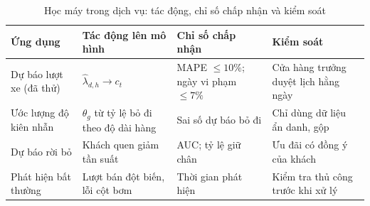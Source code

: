 {\begin{table}[htbp]\centering\small
\caption{Học máy trong dịch vụ: tác động, chỉ số chấp nhận và kiểm soát}\label{r3:ml-uses}
\begin{tabularx}{\linewidth}{@{}p{27mm}Y Y Y@{}}
\toprule
Ứng dụng & Tác động lên mô hình & Chỉ số chấp nhận & Kiểm soát \\
\midrule
Dự báo lượt xe (đã thử) & $\hat\lambda_{d,h}\to c_t$ & MAPE $\le10\%$; ngày vi phạm $\le7\%$ & Cửa hàng trưởng duyệt lịch hằng ngày \\
Ước lượng độ kiên nhẫn & $\theta_g$ từ tỷ lệ bỏ đi theo độ dài hàng & Sai số dự báo bỏ đi & Chỉ dùng dữ liệu ẩn danh, gộp \\
Dự báo rời bỏ & Khách quen giảm tần suất & AUC; tỷ lệ giữ chân & Ưu đãi có đồng ý của khách \\
Phát hiện bất thường & Lượt bán đột biến, lỗi cột bơm & Thời gian phát hiện & Kiểm tra thủ công trước khi xử lý \\
\bottomrule
\end{tabularx}
\end{table}


}
